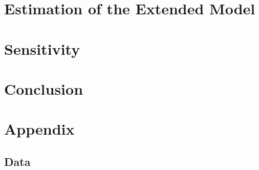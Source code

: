 \documentclass[12pt,a4paper,leqno]{article}
\begin{document}
\section{Estimation of the Extended Model}
\label{sec:estimation_extended_model}

\section{Sensitivity}
\label{sec:sensitivity}

\section{Conclusion}
\label{sec:conclusion}

\newpage
\vfill
{}




\newpage
\appendix
\section*{Appendix}
\renewcommand{\thesubsection}{\Alph{subsection}}
\setcounter{table}{0}
\renewcommand{\thetable}{A\arabic{table}}


\subsection{Data}

\end{document}
